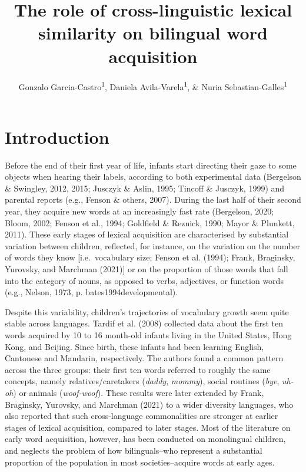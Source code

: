 \documentclass[
  english,
  man,man,floatsintext]{apa6}
\title{The role of cross-linguistic lexical similarity on bilingual word acquisition}
\author{Gonzalo Garcia-Castro\textsuperscript{1}, Daniela Avila-Varela\textsuperscript{1}, \& Nuria Sebastian-Galles\textsuperscript{1}}
\date{}
\affiliation{\vspace{0.5cm}\textsuperscript{1} Center for Brain and Cognition, Universitat Pompeu Fabra, Barcelona, Spain}
\begin{document}
\maketitle

\hypertarget{introduction}{%
\section{Introduction}\label{introduction}}

Before the end of their first year of life, infants start directing their gaze to some objects when hearing their labels, according to both experimental data (Bergelson \& Swingley, 2012, 2015; Jusczyk \& Aslin, 1995; Tincoff \& Jusczyk, 1999) and parental reports (e.g., Fenson \& others, 2007). During the last half of their second year, they acquire new words at an increasingly fast rate (Bergelson, 2020; Bloom, 2002; Fenson et al., 1994; Goldfield \& Reznick, 1990; Mayor \& Plunkett, 2011). These early stages of lexical acquisition are characterised by substantial variation between children, reflected, for instance, on the variation on the number of words they know {[}i.e.~vocabulary size; Fenson et al. (1994); Frank, Braginsky, Yurovsky, and Marchman (2021){]} or on the proportion of those words that fall into the category of nouns, as opposed to verbs, adjectives, or function words (e.g., Nelson, 1973, p. bates1994developmental).

Despite this variability, children's trajectories of vocabulary growth seem quite stable across languages. Tardif et al. (2008) collected data about the first ten words acquired by 10 to 16 month-old infants living in the United States, Hong Kong, and Beijing. Since birth, these infants had been learning English, Cantonese and Mandarin, respectively. The authors found a common pattern across the three groups: their first ten words referred to roughly the same concepts, namely relatives/caretakers (\emph{daddy}, \emph{mommy}), social routines (\emph{bye}, \emph{uh-oh}) or animals (\emph{woof-woof}). These results were later extended by Frank, Braginsky, Yurovsky, and Marchman (2021) to a wider diversity languages, who also reported that such cross-language commonalities are stronger at earlier stages of lexical acquisition, compared to later stages. Most of the literature on early word acquisition, however, has been conducted on monolingual children, and neglects the problem of how bilinguals--who represent a substantial proportion of the population in most societies--acquire words at early ages.
\end{document}
